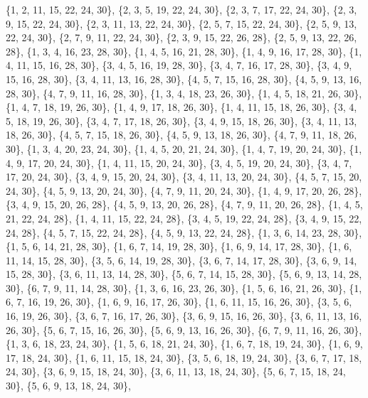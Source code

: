 \documentclass[11pt,a4paper]{article}
\begin{document}
{\{1, 2, 11, 15, 22, 24, 30\}, \{2, 3, 5, 19, 22, 24, 30\}, \{2, 3, 7, 17, 22, 24, 30\}, \{2, 3, 9, 15, 22, 24, 30\}, \{2, 3, 11, 13, 22, 24, 30\},
\{2, 5, 7, 15, 22, 24, 30\}, \{2, 5, 9, 13, 22, 24, 30\}, \{2, 7, 9, 11, 22, 24, 30\}, \{2, 3, 9, 15, 22, 26, 28\}, \{2, 5, 9, 13, 22, 26, 28\},
\{1, 3, 4, 16, 23, 28, 30\}, \{1, 4, 5, 16, 21, 28, 30\}, \{1, 4, 9, 16, 17, 28, 30\}, \{1, 4, 11, 15, 16, 28, 30\}, \{3, 4, 5, 16, 19, 28, 30\},
\{3, 4, 7, 16, 17, 28, 30\}, \{3, 4, 9, 15, 16, 28, 30\}, \{3, 4, 11, 13, 16, 28, 30\}, \{4, 5, 7, 15, 16, 28, 30\}, \{4, 5, 9, 13, 16, 28, 30\},
\{4, 7, 9, 11, 16, 28, 30\}, \{1, 3, 4, 18, 23, 26, 30\}, \{1, 4, 5, 18, 21, 26, 30\}, \{1, 4, 7, 18, 19, 26, 30\}, \{1, 4, 9, 17, 18, 26, 30\},
\{1, 4, 11, 15, 18, 26, 30\}, \{3, 4, 5, 18, 19, 26, 30\}, \{3, 4, 7, 17, 18, 26, 30\}, \{3, 4, 9, 15, 18, 26, 30\}, \{3, 4, 11, 13, 18, 26, 30\},
\{4, 5, 7, 15, 18, 26, 30\}, \{4, 5, 9, 13, 18, 26, 30\}, \{4, 7, 9, 11, 18, 26, 30\}, \{1, 3, 4, 20, 23, 24, 30\}, \{1, 4, 5, 20, 21, 24, 30\},
\{1, 4, 7, 19, 20, 24, 30\}, \{1, 4, 9, 17, 20, 24, 30\}, \{1, 4, 11, 15, 20, 24, 30\}, \{3, 4, 5, 19, 20, 24, 30\}, \{3, 4, 7, 17, 20, 24, 30\},
\{3, 4, 9, 15, 20, 24, 30\}, \{3, 4, 11, 13, 20, 24, 30\}, \{4, 5, 7, 15, 20, 24, 30\}, \{4, 5, 9, 13, 20, 24, 30\}, \{4, 7, 9, 11, 20, 24, 30\},
\{1, 4, 9, 17, 20, 26, 28\}, \{3, 4, 9, 15, 20, 26, 28\}, \{4, 5, 9, 13, 20, 26, 28\}, \{4, 7, 9, 11, 20, 26, 28\}, \{1, 4, 5, 21, 22, 24, 28\},
\{1, 4, 11, 15, 22, 24, 28\}, \{3, 4, 5, 19, 22, 24, 28\}, \{3, 4, 9, 15, 22, 24, 28\}, \{4, 5, 7, 15, 22, 24, 28\}, \{4, 5, 9, 13, 22, 24, 28\},
\{1, 3, 6, 14, 23, 28, 30\}, \{1, 5, 6, 14, 21, 28, 30\}, \{1, 6, 7, 14, 19, 28, 30\}, \{1, 6, 9, 14, 17, 28, 30\}, \{1, 6, 11, 14, 15, 28, 30\},
\{3, 5, 6, 14, 19, 28, 30\}, \{3, 6, 7, 14, 17, 28, 30\}, \{3, 6, 9, 14, 15, 28, 30\}, \{3, 6, 11, 13, 14, 28, 30\}, \{5, 6, 7, 14, 15, 28, 30\},
\{5, 6, 9, 13, 14, 28, 30\}, \{6, 7, 9, 11, 14, 28, 30\}, \{1, 3, 6, 16, 23, 26, 30\}, \{1, 5, 6, 16, 21, 26, 30\}, \{1, 6, 7, 16, 19, 26, 30\},
\{1, 6, 9, 16, 17, 26, 30\}, \{1, 6, 11, 15, 16, 26, 30\}, \{3, 5, 6, 16, 19, 26, 30\}, \{3, 6, 7, 16, 17, 26, 30\}, \{3, 6, 9, 15, 16, 26, 30\},
\{3, 6, 11, 13, 16, 26, 30\}, \{5, 6, 7, 15, 16, 26, 30\}, \{5, 6, 9, 13, 16, 26, 30\}, \{6, 7, 9, 11, 16, 26, 30\}, \{1, 3, 6, 18, 23, 24, 30\},
\{1, 5, 6, 18, 21, 24, 30\}, \{1, 6, 7, 18, 19, 24, 30\}, \{1, 6, 9, 17, 18, 24, 30\}, \{1, 6, 11, 15, 18, 24, 30\}, \{3, 5, 6, 18, 19, 24, 30\},
\{3, 6, 7, 17, 18, 24, 30\}, \{3, 6, 9, 15, 18, 24, 30\}, \{3, 6, 11, 13, 18, 24, 30\}, \{5, 6, 7, 15, 18, 24, 30\}, \{5, 6, 9, 13, 18, 24, 30\},
}
\end{document}
